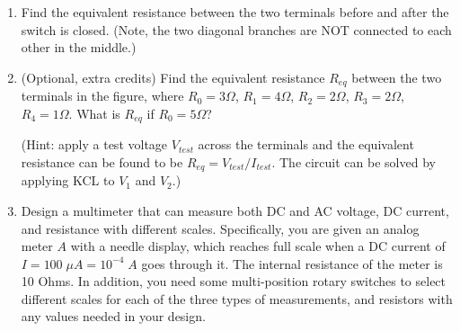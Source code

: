 \begin{enumerate}



\item Find the equivalent resistance between 
the two terminals before and after the switch is closed. (Note, the two 
diagonal branches are NOT connected to each other in the middle.)


\item (Optional, extra credits) Find the equivalent resistance $R_{eq}$ 
between the two terminals in the figure, where $R_0=3\Omega$, $R_1=4\Omega$, 
$R_2=2\Omega$, $R_3=2\Omega$, $R_4=1\Omega$. What is $R_{eq}$ if $R_0=5\Omega$?

(Hint: apply a test voltage $V_{test}$ across the terminals and the 
equivalent resistance can be found to be $R_{eq}=V_{test}/I_{test}$.
The circuit can be solved by applying KCL to $V_1$ and $V_2$.)





\item Design a multimeter that can measure both DC and AC voltage, DC current,
  and resistance with different scales. Specifically, you are given an analog 
  meter $A$ with a needle display, which reaches full scale when a DC current 
  of $I=100\;\mu A=10^{-4}\;A$ goes through it. The internal resistance of the
  meter is 10 Ohms. In addition, you need some multi-position rotary switches 
  to select different scales for each of the three types of measurements, and 
  resistors with any values needed in your design.


\end{enumerate}
